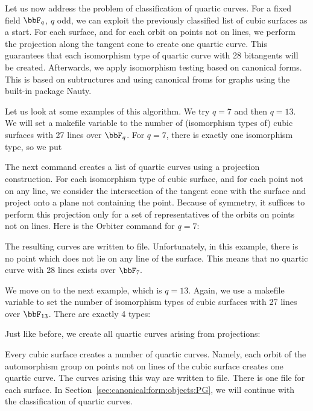 Let us now address the problem of classification of quartic curves.
For a fixed field $\bbF_q$, $q$ odd, 
we can exploit the previously classified list 
of cubic surfaces as a start. 
For each surface, and for each orbit on points not on lines, 
we perform the projection along the tangent cone to create one quartic curve. 
This guarantees that each isomorphism type of quartic curve with 28 bitangents will be created.
Afterwards, we apply isomorphism testing based on canonical forms. 
This is based on subtructures 
and using canonical froms for graphs using the built-in package Nauty.

\bigskip

Let us look at some examples of this algorithm.
We try $q=7$ and then $q=13.$
We will set  a 
makefile variable to the number of 
(isomorphism types of) cubic surfaces 
with 27 lines over $\bbF_q$. 
For $q=7$, there is exactly one isomorphism type, so we put 


The next command creates a list of 
quartic curves using a projection construction. 
For each isomorphism type of cubic surface, 
and for each point not on any line, we 
consider the intersection of the tangent cone 
with the surface and project onto a plane not containing the point. 
Because of symmetry, it suffices to perform this projection 
only for a set of representatives of the orbits 
on points not on lines. 
Here is the Orbiter command for $q=7$:


The resulting curves are written to file. 
Unfortunately, in this example, 
there is no point which does not lie on any line of the surface.
This means that no quartic curve with 28 lines exists over $\bbF_7.$ 


\bigskip


We move on to the next example, 
which is $q=13$.
Again, we use a makefile variable 
to set the number of isomorphism types of 
cubic surfaces with 27 lines over $\bbF_{13}$. 
There are exactly 4 types:


Just like before, we create all 
quartic curves arising from projections:


Every cubic surface creates a number of quartic curves.
Namely, each orbit of the automorphism 
group on points not on lines of the cubic surface 
creates one quartic curve. 
The curves arising this way are written to file. 
There is one file for each surface.
In Section~\ref{sec:canonical:form:objects:PG}, 
we will continue with the classification of quartic curves.





\bigskip




